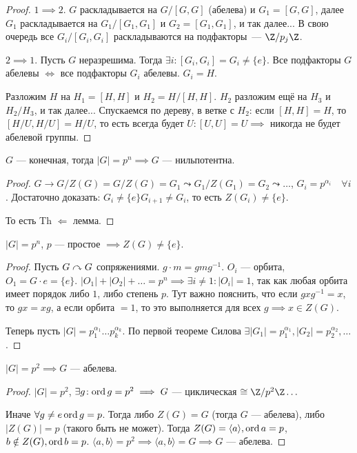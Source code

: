 \begin{proof}
    $1 \implies 2$. $G$ раскладывается на $G / [G, G]$ (абелева) и $G_1 = [G, G]$, далее $G_1$ раскладывается на $G_1 / [G_1, G_1]$ и $G_2 = [G_1, G_1]$, и так далее... В свою очередь все $G_i / [G_i, G_i]$ раскладываются на подфакторы~--- $\Z / p_j \Z$.

    $2 \implies 1$. Пусть $G$ неразрешима. Тогда  $\exists i\!: [G_i, G_i] = G_i \neq \{e\}$. Все подфакторы  $G$ абелевы  $\iff$ все подфакторы  $G_i$ абелевы.  $G_i = H$.

    Разложим  $H$ на $H_1 = [H, H]$ и $H_2 = H / [H, H]$. $H_2$ разложим ещё на $H_3$ и $H_2 / H_3$, и так далее... Спускаемся по дереву, в ветке с $H_2$: если $[H, H] = H$, то $[H / U, H / U] = H / U$, то есть всегда будет $U: [U, U] = U \implies$ никогда не будет абелевой группы.
\end{proof}
\begin{theorem}
    $G$ --- конечная, тогда  $|G| = p^n \implies G$ --- нильпотентна.
\end{theorem}
\begin{proof}
    $G \to G / Z(G) = G / Z(G) = G_1 \leadsto G_1 / Z(G_1) = G_2 \leadsto \ldots$, $G_i = p^{\alpha_i} \quad \forall i$. Достаточно доказать:  $G_i \neq \{e\} G_{i+1} \neq G_i$, то есть  $Z(G_i) \neq \{e\}$.

    То есть  Th  $\Leftarrow$  лемма.
\end{proof}
\begin{lemma}
    $|G| = p^n$,  $p$ --- простое  $\implies Z(G) \neq \{e\}$.
\end{lemma}
\begin{proof}
    Пусть $G \curvearrowright G$ сопряжениями. $g \cdot m = g m g^{-1}$.   $O_i$ --- орбита,  $O_1 = G \cdot e = \{e\}$.  $|O_1| + |O_2| + \ldots = p^n \implies \exists i \neq 1\!: |O_i| = 1$, так как любая орбита имеет порядок либо $1$, либо степень $p$. Тут важно пояснить, что если $gxg^{-1} = x$, то  $gx = xg$, а если орбита  $=1$, то это выполняется для всех  $g \implies x\in Z(G)$.

    Теперь пусть $|G| = p_1^{\alpha_1} \ldots p_k^{\alpha_k}$. По первой теореме Силова $\exists |G_1| = p_1^{\alpha_1}, |G_2| = p_2^{\alpha_2}, \ldots$.
\end{proof}
\begin{theorem}
    $|G| = p^2 \implies G$ --- абелева.
\end{theorem}
\begin{proof}
    $|G| = p^2$,  $\exists g\!: \operatorname{ord} g =p^2 \implies G$ --- циклическая  $\cong \Z / p^2 \Z \ldots$

    Иначе $\forall g \neq e \operatorname{ord} g = p$.  Тогда либо $Z(G) = G$ (тогда $G$ --- абелева), либо $|Z(G)| = p$ (такого быть не может). Тогда  $Z(G) = \langle a \rangle, \operatorname{ord} a = p$,  $b \notin Z(G), \operatorname{ord} b = p$.  $\langle a, b\rangle = p^2 \implies \langle a, b \rangle = G \implies G$ --- абелева.
\end{proof}
